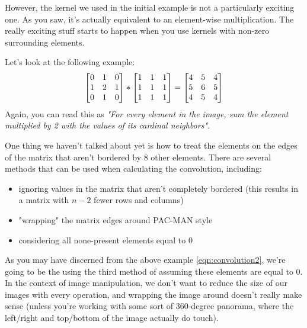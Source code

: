 \documentclass{tufte-handout}
\begin{document}
However, the kernel we used in the initial example is not a particularly exciting one. As you saw, it's actually equivalent to an element-wise multiplication. The really exciting stuff starts to happen when you use kernels with non-zero surrounding elements.

Let's look at the following example:
\begin{align}\label{eqn:convolution2}
    \begin{bmatrix} 0 & 1 & 0 \\ 1 & 2 & 1 \\ 0 & 1 & 0 \end{bmatrix} * \begin{bmatrix} 1 & 1 & 1 \\ 1 & 1 & 1 \\ 1 & 1 & 1 \end{bmatrix} =
    \begin{bmatrix} 4 & 5 & 4 \\ 5 & 6 & 5 \\ 4 & 5 & 4 \end{bmatrix}
\end{align}
Again, you can read this as \emph{"For every element in the image, sum the element multiplied by 2 with the values of its cardinal neighbors"}.

One thing we haven't talked about yet is how to treat the elements on the edges of the matrix that aren't bordered by 8 other elements. There are several methods that can be used when calculating the convolution, including:
\begin{itemize}
    \item ignoring values in the matrix that aren't completely bordered (this results in a matrix with $n-2$ fewer rows and columns)
    \item "wrapping" the matrix edges around PAC-MAN style
    \item considering all none-present elements equal to 0
\end{itemize}
As you may have discerned from the above example \eqref{eqn:convolution2}, we're going to be the using the third method of assuming these elements are equal to 0. In the context of image manipulation, we don't want to reduce the size of our images with every operation, and wrapping the image around doesn't really make sense (unless you're working with some sort of 360-degree panorama, where the left/right and top/bottom of the image actually do touch).
\end{document}
